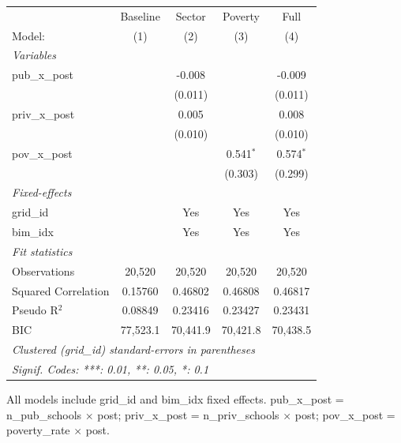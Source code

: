 
\begingroup
\centering
\begin{tabular}{lcccc}
   \tabularnewline \midrule \midrule
                       & Baseline & Sector   & Poverty     & Full \\   
   Model:              & (1)      & (2)      & (3)         & (4)\\  
   \midrule
   \emph{Variables}\\
   pub\_x\_post        &          & -0.008   &             & -0.009\\   
                       &          & (0.011)  &             & (0.011)\\   
   priv\_x\_post       &          & 0.005    &             & 0.008\\   
                       &          & (0.010)  &             & (0.010)\\   
   pov\_x\_post        &          &          & 0.541$^{*}$ & 0.574$^{*}$\\   
                       &          &          & (0.303)     & (0.299)\\   
   \midrule
   \emph{Fixed-effects}\\
   grid\_id            &          & Yes      & Yes         & Yes\\  
   bim\_idx            &          & Yes      & Yes         & Yes\\  
   \midrule
   \emph{Fit statistics}\\
   Observations        & 20,520   & 20,520   & 20,520      & 20,520\\  
   Squared Correlation & 0.15760  & 0.46802  & 0.46808     & 0.46817\\  
   Pseudo R$^2$        & 0.08849  & 0.23416  & 0.23427     & 0.23431\\  
   BIC                 & 77,523.1 & 70,441.9 & 70,421.8    & 70,438.5\\  
   \midrule \midrule
   \multicolumn{5}{l}{\emph{Clustered (grid\_id) standard-errors in parentheses}}\\
   \multicolumn{5}{l}{\emph{Signif. Codes: ***: 0.01, **: 0.05, *: 0.1}}\\
\end{tabular}
 
\par \raggedright 
All models include grid\_id and bim\_idx fixed effects. pub\_x\_post = n\_pub\_schools $\times$ post; priv\_x\_post = n\_priv\_schools $\times$ post; pov\_x\_post = poverty\_rate $\times$ post.
\par\endgroup


